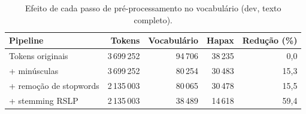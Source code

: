 \begin{table}[t]\centering\small\setlength{\tabcolsep}{10pt}
\caption{Efeito de cada passo de pré-processamento no vocabulário (dev, texto completo).}\label{tab:vocab}
\begin{tabular}{lrrrr}
\toprule
Pipeline & Tokens & Vocabulário & Hapax & Redução (\%) \\
\midrule
Tokens originais & 3\,699\,252 & 94\,706 & 38\,235 & 0,0 \\
+ minúsculas & 3\,699\,252 & 80\,254 & 30\,483 & 15,3 \\
+ remoção de stopwords & 2\,135\,003 & 80\,065 & 30\,478 & 15,5 \\
+ stemming RSLP & 2\,135\,003 & 38\,489 & 14\,618 & 59,4 \\
\bottomrule
\end{tabular}
\end{table}
